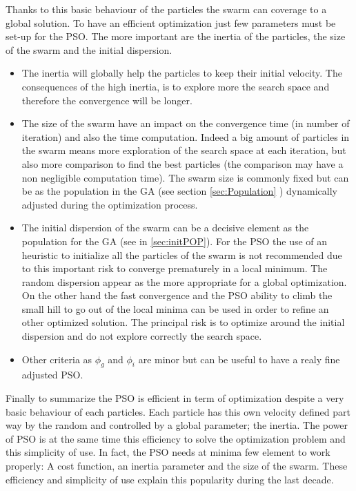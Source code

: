 Thanks to this basic behaviour of the particles the swarm can coverage to a global solution. 
To have an efficient optimization just few parameters must be set-up for the PSO.  
The more important are the inertia of the particles, the size of the swarm and the initial dispersion.
\begin{itemize}
\item The inertia will globally help the particles to keep their initial velocity. The consequences of the high inertia, is to explore more the search space and therefore the convergence will be longer. 
\item The size of the swarm  have an impact on the convergence time (in number of iteration) and  also the time computation. Indeed a big amount of particles in the swarm  means more exploration of the search space at each iteration, but also more comparison to find the best particles (the comparison may have a non negligible computation time). 
The swarm size is commonly fixed but can be as the population in the GA (see section \ref{sec:Population} ) dynamically adjusted during the optimization process. 

\item The initial dispersion of the swarm can be a decisive element as the population for the GA (see in \ref{sec:initPOP}). For the PSO the use of an heuristic to initialize all the particles of the swarm is not recommended due to this important risk to converge prematurely in a local minimum. The random dispersion appear as the more appropriate for a global optimization. On the other hand the fast convergence and the PSO ability to climb the small hill to go out of the local minima can be used in order to refine an other optimized solution. The principal risk is to optimize around the initial dispersion and do not explore correctly the search space.  
\item Other criteria as $\phi_g$ and $\phi_i$ are minor but can be useful to have a realy fine adjusted PSO.
\end{itemize}

Finally to summarize the PSO is efficient in term of optimization despite a very basic behaviour of each  particles. Each particle has this own velocity defined part way by the random and controlled by a global parameter; the inertia.
 The power of PSO is at the same time this efficiency to solve the optimization problem and this simplicity of use. In fact, the PSO needs at minima few element to work properly:
 A cost function, an inertia parameter and the size of the swarm. These efficiency and simplicity of use explain this popularity during the last decade.
 





